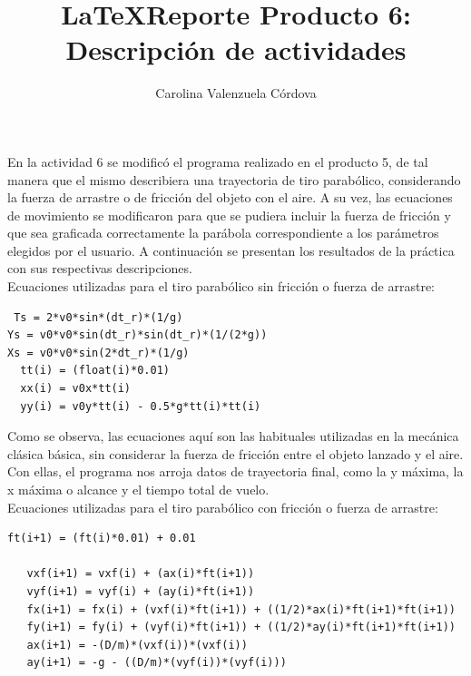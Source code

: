 \documentclass[12pt]{article}
\author{Carolina Valenzuela Córdova}
\title{\LaTeX}
\date{}
\begin{document}
\title{Reporte Producto 6: Descripción de actividades}
\maketitle{}
  
  En la actividad 6 se modificó el programa realizado en el producto 5, de tal manera que el mismo describiera una trayectoria de tiro parabólico, 
  considerando la fuerza de arrastre o de fricción del objeto con el aire.
A su vez, las ecuaciones de movimiento se modificaron para que se pudiera incluir la fuerza de fricción y que sea graficada correctamente la 
  parábola correspondiente a los parámetros elegidos por el usuario.
  A continuación se presentan los resultados de la práctica con sus respectivas descripciones.\\
  
  Ecuaciones utilizadas para el tiro parabólico sin fricción o fuerza de arrastre:\\
 
 \begin{verbatim}
 Ts = 2*v0*sin*(dt_r)*(1/g)
Ys = v0*v0*sin(dt_r)*sin(dt_r)*(1/(2*g))
Xs = v0*v0*sin(2*dt_r)*(1/g)
  tt(i) = (float(i)*0.01)
  xx(i) = v0x*tt(i) 
  yy(i) = v0y*tt(i) - 0.5*g*tt(i)*tt(i)
 \end{verbatim}


 
  
  
  Como se observa, las ecuaciones aquí son las habituales utilizadas en la mecánica clásica básica, sin considerar la fuerza de fricción entre el objeto lanzado y el aire. 
  Con ellas, el programa nos arroja datos de trayectoria final, como la y máxima, la x máxima o alcance y el tiempo total de vuelo.\\
  
  
  Ecuaciones utilizadas para el tiro parabólico con fricción o fuerza de arrastre:
  


\begin{verbatim}
ft(i+1) = (ft(i)*0.01) + 0.01
  
   vxf(i+1) = vxf(i) + (ax(i)*ft(i+1))
   vyf(i+1) = vyf(i) + (ay(i)*ft(i+1))
   fx(i+1) = fx(i) + (vxf(i)*ft(i+1)) + ((1/2)*ax(i)*ft(i+1)*ft(i+1))
   fy(i+1) = fy(i) + (vyf(i)*ft(i+1)) + ((1/2)*ay(i)*ft(i+1)*ft(i+1))
   ax(i+1) = -(D/m)*(vxf(i))*(vxf(i))
   ay(i+1) = -g - ((D/m)*(vyf(i))*(vyf(i)))
  
\end{verbatim}
\end{document}
